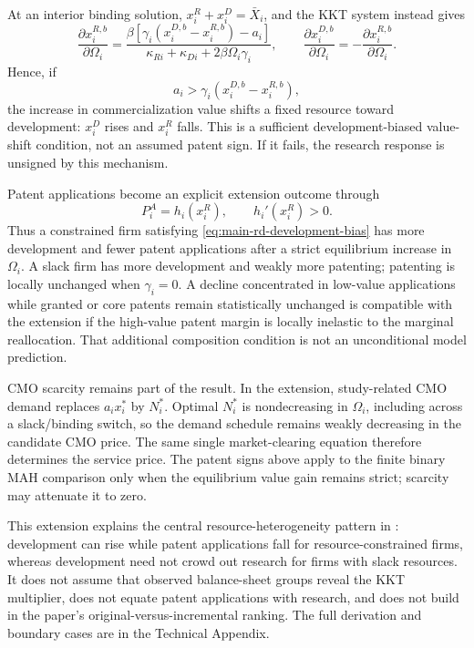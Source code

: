 \documentclass[12pt]{article}
\newcommand{\1}{\mathbf{1}}
\begin{document}
At an interior binding solution, \(x_i^R+x_i^D=\bar X_i\), and the KKT system
instead gives
\begin{equation}
  \frac{\partial x_i^{R,b}}{\partial\Omega_i}
  =
  \frac{\beta[\gamma_i(x_i^{D,b}-x_i^{R,b})-a_i]}
       {\kappa_{Ri}+\kappa_{Di}
        +2\beta\Omega_i\gamma_i},
  \qquad
  \frac{\partial x_i^{D,b}}{\partial\Omega_i}
  =-\frac{\partial x_i^{R,b}}{\partial\Omega_i}.
  \label{eq:main-rd-binding-signs}
\end{equation}
Hence, if
\begin{equation}
  a_i>\gamma_i(x_i^{D,b}-x_i^{R,b}),
  \label{eq:main-rd-development-bias}
\end{equation}
the increase in commercialization value shifts a fixed resource toward
development: \(x_i^D\) rises and \(x_i^R\) falls. This is a sufficient
development-biased value-shift condition, not an assumed patent sign. If it
fails, the research response is unsigned by this mechanism.

Patent applications become an explicit extension outcome through
\begin{equation}
  P_i^A=h_i(x_i^R),
  \qquad h_i'(x_i^R)>0.
  \label{eq:main-rd-patents}
\end{equation}
Thus a constrained firm satisfying
\eqref{eq:main-rd-development-bias} has more development and fewer patent
applications after a strict equilibrium increase in \(\Omega_i\). A slack
firm has more development and weakly more patenting; patenting is locally
unchanged when \(\gamma_i=0\). A decline concentrated in low-value
applications while granted or core patents remain statistically unchanged is
compatible with the extension if the high-value patent margin is locally
inelastic to the marginal reallocation. That additional composition
condition is not an unconditional model prediction.

CMO scarcity remains part of the result. In the extension, study-related CMO
demand replaces \(a_ix_i^*\) by \(N_i^*\). Optimal \(N_i^*\) is
nondecreasing in \(\Omega_i\), including across a slack/binding switch, so
the demand schedule remains weakly decreasing in the candidate CMO price.
The same single market-clearing equation therefore determines the service
price. The patent signs above apply to the finite binary MAH comparison only
when the equilibrium value gain remains strict; scarcity may attenuate it to
zero.

This extension explains the central resource-heterogeneity pattern in
\citet{Gu2024}: development can rise while patent applications fall for
resource-constrained firms, whereas development need not crowd out research
for firms with slack resources. It does not assume that observed balance-sheet
groups reveal the KKT multiplier, does not equate patent applications with
research, and does not build in the paper's original-versus-incremental
ranking. The full derivation and boundary cases are in the Technical
Appendix.
\end{document}
